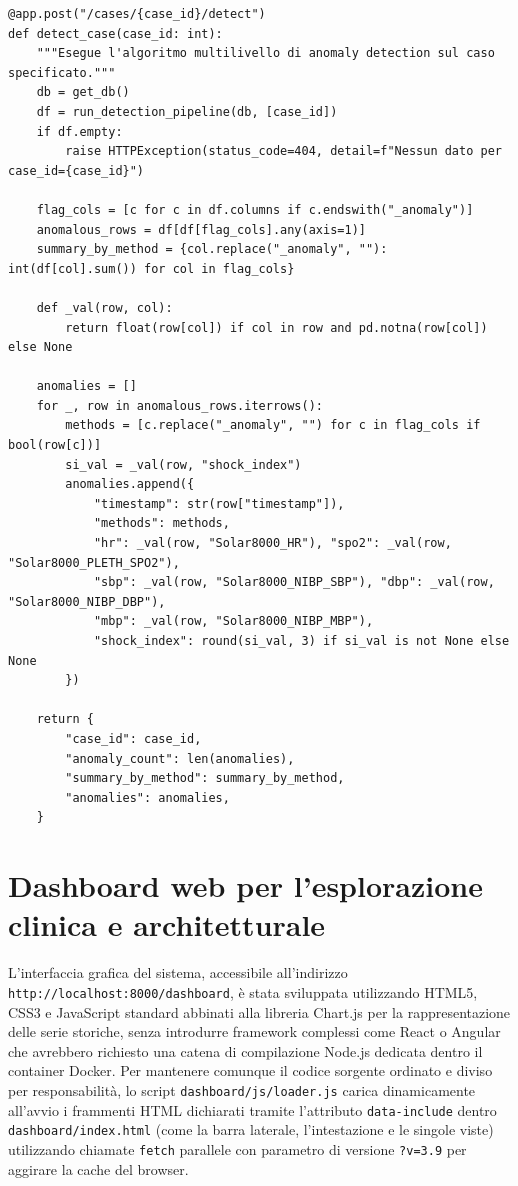 \vspace{4pt}
\noindent\begin{minipage}{\textwidth}
\begin{lstlisting}
@app.post("/cases/{case_id}/detect")
def detect_case(case_id: int):
    """Esegue l'algoritmo multilivello di anomaly detection sul caso specificato."""
    db = get_db()
    df = run_detection_pipeline(db, [case_id])
    if df.empty:
        raise HTTPException(status_code=404, detail=f"Nessun dato per case_id={case_id}")

    flag_cols = [c for c in df.columns if c.endswith("_anomaly")]
    anomalous_rows = df[df[flag_cols].any(axis=1)]
    summary_by_method = {col.replace("_anomaly", ""): int(df[col].sum()) for col in flag_cols}

    def _val(row, col):
        return float(row[col]) if col in row and pd.notna(row[col]) else None

    anomalies = []
    for _, row in anomalous_rows.iterrows():
        methods = [c.replace("_anomaly", "") for c in flag_cols if bool(row[c])]
        si_val = _val(row, "shock_index")
        anomalies.append({
            "timestamp": str(row["timestamp"]),
            "methods": methods,
            "hr": _val(row, "Solar8000_HR"), "spo2": _val(row, "Solar8000_PLETH_SPO2"),
            "sbp": _val(row, "Solar8000_NIBP_SBP"), "dbp": _val(row, "Solar8000_NIBP_DBP"),
            "mbp": _val(row, "Solar8000_NIBP_MBP"),
            "shock_index": round(si_val, 3) if si_val is not None else None
        })

    return {
        "case_id": case_id,
        "anomaly_count": len(anomalies),
        "summary_by_method": summary_by_method,
        "anomalies": anomalies,
    }
\end{lstlisting}
\label{lst:api_detect}
\end{minipage}
\vspace{8pt}

\section{Dashboard web per l'esplorazione clinica e architetturale}
L'interfaccia grafica del sistema, accessibile all'indirizzo \texttt{http://localhost:8000/dashboard}, \`e stata sviluppata utilizzando HTML5, CSS3 e JavaScript standard abbinati alla libreria Chart.js per la rappresentazione delle serie storiche, senza introdurre framework complessi come React o Angular che avrebbero richiesto una catena di compilazione Node.js dedicata dentro il container Docker. Per mantenere comunque il codice sorgente ordinato e diviso per responsabilit\`a, lo script \texttt{dashboard/js/loader.js} carica dinamicamente all'avvio i frammenti HTML dichiarati tramite l'attributo \texttt{data-include} dentro \texttt{dashboard/index.html} (come la barra laterale, l'intestazione e le singole viste) utilizzando chiamate \texttt{fetch} parallele con parametro di versione \texttt{?v=3.9} per aggirare la cache del browser.

